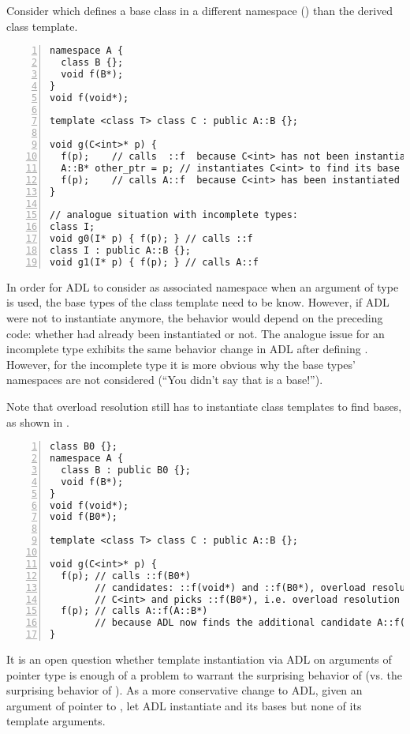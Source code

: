 Consider  which defines a base class in a different namespace 
() than the derived class template.
\begin{lstlisting}[style=Vc,numbers=left,float={hbtp},label=lst:baseNamespace,caption={
ADL in namespace of base class
}]
namespace A {
  class B {};
  void f(B*);
}
void f(void*);

template <class T> class C : public A::B {};

void g(C<int>* p) {
  f(p);    // calls  ::f  because C<int> has not been instantiated
  A::B* other_ptr = p; // instantiates C<int> to find its base types
  f(p);    // calls A::f  because C<int> has been instantiated before ADL
}

// analogue situation with incomplete types:
class I;
void g0(I* p) { f(p); } // calls ::f
class I : public A::B {};
void g1(I* p) { f(p); } // calls A::f
\end{lstlisting}
In order for ADL to consider  as associated namespace when an argument of type 
 is used, the base types of the class template need to be know. However, if 
ADL were not to instantiate  anymore, the behavior would depend on the 
preceding code: whether  had already been instantiated or not. The analogue 
issue for an incomplete type  exhibits the same behavior change in ADL after 
defining . However, for the incomplete type it is more obvious why the base types' 
namespaces are not considered (“You didn't say that  is a base!”).

Note that overload resolution still has to instantiate class templates to find bases, as 
shown in .
\begin{lstlisting}[style=Vc,numbers=left,float={hbtp},label=lst:instantiateOverloadResolution,caption={
Class template instantiation on overload resolution if ADL does not instantiate 
\code{C<int>}
}]
class B0 {};
namespace A {
  class B : public B0 {};
  void f(B*);
}
void f(void*);
void f(B0*);

template <class T> class C : public A::B {};

void g(C<int>* p) {
  f(p); // calls ::f(B0*)
        // candidates: ::f(void*) and ::f(B0*), overload resolution instantiates
        // C<int> and picks ::f(B0*), i.e. overload resolution works unchanged
  f(p); // calls A::f(A::B*)
        // because ADL now finds the additional candidate A::f(A::B*)
}
\end{lstlisting}
It is an open question whether template instantiation via ADL on arguments of pointer type 
is enough of a problem to warrant the surprising behavior of 
 (vs. the surprising behavior of ). As a 
more conservative change to ADL, given an argument of pointer to , let ADL 
instantiate  and its bases but none of its template arguments.

